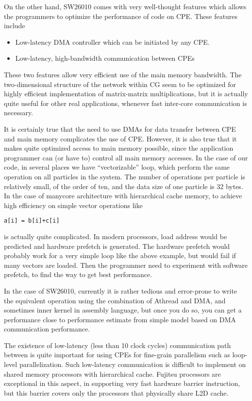 \documentclass[sigconf]{acmart}
\begin{document}
On the other hand, SW26010 comes with very well-thought features which
allows the programmers to optimize the performance of code on
CPE. These features include
\begin{itemize}

\item Low-latency DMA controller which can be initiated by any CPE.
\item Low-latency, high-bandwidth communication between CPEs
  
\end{itemize}  

These two features allow very efficient use of the main memory
bandwidth. The two-dimensional structure of the network within CG seem
to be optimized for highly efficient implementation of matrix-matrix
multiplications, but it is actually quite useful for other real
applications, whenever fast inter-core communication is necessary.

It is certainly true that the need to use DMAs for data transfer
between CPE and main memory complicates the use of CPE. However, it is
also true that it makes quite optimized access to main memory
possible, since the application programmer can (or have to) control
all main memory accesses. In the case of our code, in several places
we have ``vectorizable'' loop, which perform the same operation on all
particles in the system. The number of operations per particle is
relatively small, of the order of ten, and the data size of one
particle is 32 bytes. In the case of manycore architecture with
hierarchical cache memory, to achieve high efficiency on simple vector
operations like 

{\tt a[i] =   b[i]+c[i]}

is actually quite complicated. In modern processors, load address
would be predicted and hardware prefetch is generated. The hardware
prefetch would probably work for a very simple loop like the above
example, but would fail if many vectors are loaded. Then the
programmer need to experiment with software prefetch, to find the way
to get best performance. 

In the case of SW26010, currently it is rather tedious and error-prone
to write the equivalent operation using the combination of Athread and
DMA, and sometimes inner kernel in assembly language, but once you do
so, you can get a performance close to performance estimate from
simple model based on DMA communication performance. 

The existence of low-latency (less than 10 clock cycles) communication
path between is quite important for using CPEs for fine-grain
parallelism such as loop-level parallelization. Such low-latency
communication is difficult to implement on shared memory processors
with hierarchical cache. Fujitsu processors are exceptional in this
aspect, in supporting very fast hardware barrier instruction, but this
barrier covers only the processors that physically share L2D cache.
\end{document}
